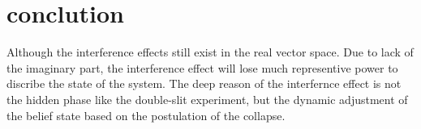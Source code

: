 \documentclass[11pt,notitlepage]{article}
\begin{document}
\section{conclution}
Although the interference effects still exist in the real vector space. Due to lack of the imaginary part, the interference effect will lose much representive power to discribe the state of the system. The deep reason of the interfernce effect is not the hidden phase like the double-slit experiment, but the dynamic adjustment of the belief state based on the postulation of the collapse. 
\end{document}
